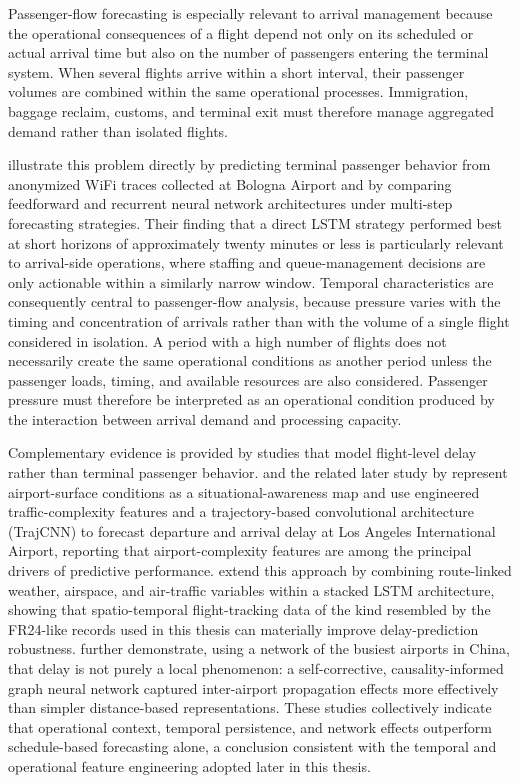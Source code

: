 Passenger-flow forecasting is especially relevant to arrival management because the operational consequences of a flight depend not only on its scheduled or actual arrival time but also on the number of passengers entering the terminal system. When several flights arrive within a short interval, their passenger volumes are combined within the same operational processes. Immigration, baggage reclaim, customs, and terminal exit must therefore manage aggregated demand rather than isolated flights.

\textcite{orsini2019neural} illustrate this problem directly by predicting terminal passenger behavior from anonymized WiFi traces collected at Bologna Airport and by comparing feedforward and recurrent neural network architectures under multi-step forecasting strategies. Their finding that a direct LSTM strategy performed best at short horizons of approximately twenty minutes or less is particularly relevant to arrival-side operations, where staffing and queue-management decisions are only actionable within a similarly narrow window. Temporal characteristics are consequently central to passenger-flow analysis, because pressure varies with the timing and concentration of arrivals rather than with the volume of a single flight considered in isolation. A period with a high number of flights does not necessarily create the same operational conditions as another period unless the passenger loads, timing, and available resources are also considered. Passenger pressure must therefore be interpreted as an operational condition produced by the interaction between arrival demand and processing capacity.

Complementary evidence is provided by studies that model flight-level delay rather than terminal passenger behavior. \textcite{shao2019flight} and the related later study by \textcite{shao2022predicting} represent airport-surface conditions as a situational-awareness map and use engineered traffic-complexity features and a trajectory-based convolutional architecture (TrajCNN) to forecast departure and arrival delay at Los Angeles International Airport, reporting that airport-complexity features are among the principal drivers of predictive performance. \textcite{zhang2021spatiotemporal} extend this approach by combining route-linked weather, airspace, and air-traffic variables within a stacked LSTM architecture, showing that spatio-temporal flight-tracking data of the kind resembled by the FR24-like records used in this thesis can materially improve delay-prediction robustness. \textcite{zhu2024spatiotemporal} further demonstrate, using a network of the busiest airports in China, that delay is not purely a local phenomenon: a self-corrective, causality-informed graph neural network captured inter-airport propagation effects more effectively than simpler distance-based representations. These studies collectively indicate that operational context, temporal persistence, and network effects outperform schedule-based forecasting alone, a conclusion consistent with the temporal and operational feature engineering adopted later in this thesis.

